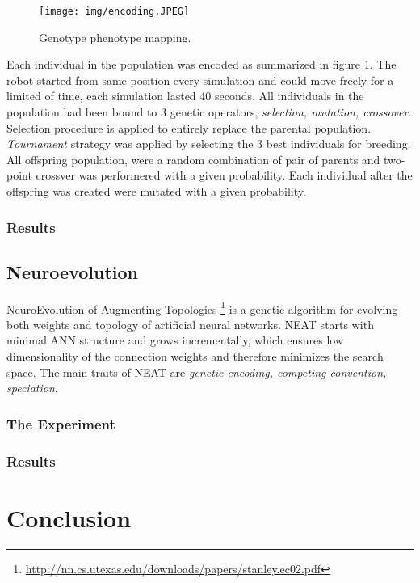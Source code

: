 \documentclass[format=acmsmall, review=false, screen=true]{acmart}
\begin{document}
\begin{figure}[H]
  \texttt{[image: img/encoding.JPEG]}
  \caption{Genotype phenotype mapping.}
  \label{fig:encoding}
\end{figure}

Each individual in the population was encoded as summarized in figure \ref{fig:encoding}. The robot started from same position every simulation and could move freely for a limited of time, each simulation lasted 40 seconds. All individuals in the population had been bound to 3 genetic operators, \emph{selection, mutation, crossover}. Selection procedure is applied to entirely replace the parental population. \emph{Tournament} strategy was applied by selecting the 3 best individuals for breeding. All offspring population, were a random combination of pair of parents and two-point crossver was performered with a given probability. Each individual after the offspring was created were mutated with a given probability.

\subsubsection{Results}

\subsection{Neuroevolution}

NeuroEvolution of Augmenting Topologies \footnote{\url{http://nn.cs.utexas.edu/downloads/papers/stanley.ec02.pdf}} is a genetic algorithm for evolving both weights and topology of artificial neural networks. NEAT starts with minimal ANN structure and grows incrementally, which ensures low dimensionality of the connection weights and therefore minimizes the search space. The main traits of NEAT are \emph{genetic encoding, competing convention, speciation}.

\subsubsection{The Experiment}



\subsubsection{Results}

\section{Conclusion}
\end{document}

